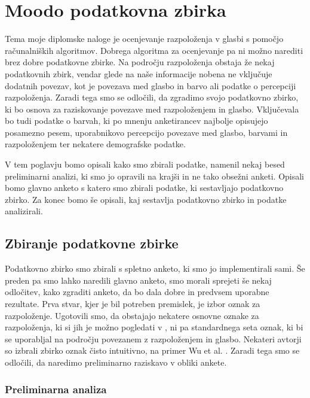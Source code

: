 \documentclass[a4paper, 12pt]{book}
\begin{document}
{\chapter{Moodo podatkovna zbirka}
\label{odatasetu}

Tema moje diplomske naloge je ocenjevanje razpoloženja v glasbi s pomočjo računalniških algoritmov. Dobrega algoritma za ocenjevanje pa ni možno narediti brez dobre podatkovne zbirke. Na področju razpoloženja obstaja že nekaj podatkovnih zbirk, vendar glede na naše informacije nobena ne vključuje dodatnih povezav, kot je povezava med glasbo in barvo ali podatke o percepciji razpoloženja. Zaradi tega smo se odločili, da zgradimo svojo podatkovno zbirko, ki bo osnova za raziskovanje povezave med razpoloženjem in glasbo. Vključevala bo tudi podatke o barvah, ki po mnenju anketirancev najbolje opisujejo posamezno pesem, uporabnikovo percepcijo povezave med glasbo, barvami in razpoloženjem ter nekatere demografske podatke.

V tem poglavju bomo opisali kako smo zbirali podatke, namenil nekaj besed preliminarni analizi, ki smo jo opravili na krajši in ne tako obsežni anketi. Opisali bomo glavno anketo s katero smo zbirali podatke, ki sestavljajo podatkovno zbirko. Za konec bomo še opisali, kaj sestavlja podatkovno zbirko in podatke analizirali. 


\section{Zbiranje podatkovne zbirke}

Podatkovno zbirko smo zbirali s spletno anketo, ki smo jo implementirali sami. Še preden pa smo lahko naredili glavno anketo, smo morali sprejeti še nekaj odločitev, kako zgraditi anketo, da bo dala dobre in predvsem uporabne rezultate. Prva stvar, kjer je bil potreben premislek, je izbor oznak za razpoloženje. Ugotovili smo, da obstajajo nekatere osnovne oznake za razpoloženja, ki si jih je možno pogledati v \cite{dalgleish1999handbook}, ni pa standardnega seta oznak, ki bi se uporabljal na področju povezanem z razpoloženjem in glasbo. Nekateri avtorji so izbrali zbirko oznak čisto intuitivno, na primer Wu et al. \cite{wu2013spectral}. Zaradi tega smo se odločili, da naredimo preliminarno raziskavo v obliki ankete. 

\subsection{Preliminarna analiza}
\label{preiliminarnaana}

}
\end{document}
